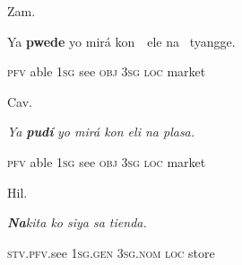\begin{listWWNumiileveli}
\item 
\begin{listWWNumiilevelii}
\item 
\begin{stylelsLanginfo}
Zam.
\end{stylelsLanginfo}
\end{listWWNumiilevelii}
\end{listWWNumiileveli}
\begin{stylelsSourceline}
Ya \textbf{pwede} yo mirá kon\ \  ele na \ tyangge.
\end{stylelsSourceline}

\begin{stylelsIMT}
\textsc{pfv} able \textsc{1sg }see \textsc{obj} 3\textsc{sg} \textsc{loc} market
\end{stylelsIMT}

\begin{listWWNumiileveli}
\item 
\begin{listWWNumiilevelii}
\item 
\begin{stylelsLanginfo}
Cav.
\end{stylelsLanginfo}
\end{listWWNumiilevelii}
\end{listWWNumiileveli}
\begin{stylelsIMT}
\textit{Ya }\textbf{\textit{pudí}}\textit{ yo mirá kon eli na plasa.}
\end{stylelsIMT}

\begin{stylelsIMT}
\textsc{pfv }able \textsc{1sg }see \textsc{obj} 3\textsc{sg} \textsc{loc} market
\end{stylelsIMT}

\begin{listWWNumiileveli}
\item 
\begin{listWWNumiilevelii}
\item 
\begin{stylelsLanginfo}
Hil.
\end{stylelsLanginfo}
\end{listWWNumiilevelii}
\end{listWWNumiileveli}
\begin{stylelsIMT}
\textbf{\textit{Na}}\textit{kita ko siya sa tienda.}
\end{stylelsIMT}

\begin{stylelsIMT}
\textsc{stv.pfv.}see\textsc{ }1\textsc{sg.gen }3\textsc{sg.nom loc }store
\end{stylelsIMT}

